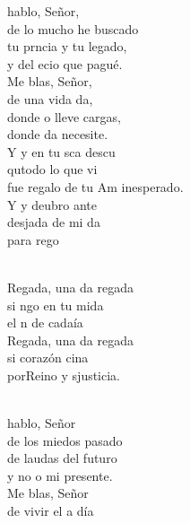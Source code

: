 \documentclass[12pt]{article}
\begin{document}
\begin{multicols*}{2}
\begin{cancion}[Regalada][Ixcís]%
	 hablo, Señor,\\
	de lo mucho he buscado\\
	tu prncia y tu legado,\\
	y del ecio que pagué.\\
\jump
	Me blas, Señor,\\
	de una vida da,\\
	donde o lleve cargas,	\\
	donde da necesite.\\
\jump
	Y y en tu sca descu\\
	qutodo lo que vi \\
	fue regalo de tu Am inesperado.\\
\jump
	Y y deubro ante\\
	desjada de mi da\\
	para  rego\\\jump\\
	\begin{chorus}%
	Regada, una da regada\\
	si ngo en tu mida \\
	el n de cadaía\\
	Regada, una da regada\\
	si  corazón cina \\
	porReino y sjusticia.\\
	\end{chorus}%
	\jump\\
	 hablo, Señor\\
	de los miedos pasado\\
	de laudas del futuro\\
	y no o mi presente.\\
\jump
	Me blas, Señor\\
	de vivir el  a día\\

\end{cancion}
\end{multicols*}
\end{document}
